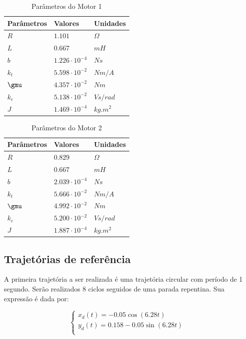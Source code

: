 \documentclass[]{politex}
\begin{document}
\begin{table}[H] 
\centering
\caption{Parâmetros do Motor 1}
\label{parametrosMotor}
\begin{tabular}{l|l|l}
Parâmetros  & Valores               & Unidades   \\ \hline
$R$         & $1.101$               & $\Omega$   \\
$L$         & $0.667$               & $mH$       \\
$b$         & $1.226 \cdot 10^{-4}$ & $N s$      \\
$k_{t}$     & $5.598 \cdot 10^{-2}$ & $Nm/A$     \\
$\gmu$      & $4.357 \cdot 10^{-2}$ & $Nm$       \\
$k_{e}$     & $5.138 \cdot 10^{-2}$ & $V s/rad$  \\
$J$         & $1.469 \cdot 10^{-4}$ & $kg.m^{2}$
\end{tabular}
\end{table} 

\begin{table}[H] 
\centering
\caption{Parâmetros do Motor 2}
\label{parametrosMotor2}
\begin{tabular}{l|l|l}
Parâmetros & Valores               & Unidades   \\ \hline
$R$        & $0.829$               & $\Omega$   \\
$L$        & $0.667$               & $mH$       \\
$b$        & $2.039 \cdot 10^{-4}$ & $N s$      \\
$k_{t}$    & $5.666 \cdot 10^{-2}$ & $Nm/A$     \\
$\gmu$     & $4.992 \cdot 10^{-2}$ & $Nm$        \\
$k_{e}$    & $5.200 \cdot 10^{-2}$ & $V s/rad$  \\
$J$        & $1.887 \cdot10^{-4}$  & $kg.m^{2}$
\end{tabular}
\end{table}

\subsection{Trajetórias de referência}

A primeira trajetória a ser realizada é uma trajetória circular com período de 1 segundo. Serão realizados 8 ciclos seguidos de uma parada repentina. Sua expressão é dada por:

\begin{equation}
\begin{cases}
x_d(t) = -0.05 \cos(6.28 t) \\
y_d(t) = 0.158 - 0.05 \sin(6.28 t) \\
\end{cases}
\end{equation}
\end{document}
